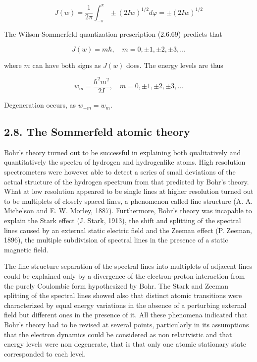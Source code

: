 \documentclass{article}
\begin{document}
\begin{equation*}
J(w)=\frac{1}{2 \pi} \int_{-\pi}^{\pi} \pm(2 I w)^{1 / 2} d \varphi= \pm(2 I w)^{1 / 2} \tag{2.7.19}
\end{equation*}
 

The Wilson-Sommerfeld quantization prescription (2.6.69) predicts that
 
\begin{equation*}
J(w)=m \hbar, \quad m=0, \pm 1, \pm 2, \pm 3, \ldots \tag{2.7.20}
\end{equation*}
 
where $m$ can have both signs as $J(w)$ does. The energy levels are thus
 
\begin{equation*}
w_{m}=\frac{\hbar^{2} m^{2}}{2 I}, \quad m=0, \pm 1, \pm 2, \pm 3, \ldots \tag{2.7.21}
\end{equation*}
 

Degeneration occurs, as $w_{-m}=w_{m}$.

\subsection*{2.8. The Sommerfeld atomic theory}

Bohr's theory turned out to be successful in explaining both qualitatively and quantitatively the spectra of hydrogen and hydrogenlike atoms. High resolution spectrometers were however able to detect a series of small deviations of the actual structure of the hydrogen spectrum from that predicted by Bohr's theory. What at low resolution appeared to be single lines at higher resolution turned out to be multiplets of closely spaced lines, a phenomenon called fine structure (A. A. Michelson and E. W. Morley, 1887). Furthermore, Bohr's theory was incapable to explain the Stark effect (J. Stark, 1913), the shift and splitting of the spectral lines caused by an external static electric field and the Zeeman effect (P. Zeeman, 1896), the multiple subdivision of spectral lines in the presence of a static magnetic field.

The fine structure separation of the spectral lines into multiplets of adjacent lines could be explained only by a divergence of the electron-proton interaction from the purely Coulombic form hypothesized by Bohr. The Stark and Zeeman splitting of the spectral lines showed also that distinct atomic transitions were characterized by equal energy variations in the absence of a perturbing external field but different ones in the presence of it. All these phenomena indicated that Bohr's theory had to be revised at several points, particularly in its assumptions that the electron dynamics could be considered as non relativistic and that energy levels were non degenerate, that is that only one atomic stationary state corresponded to each level.
\end{document}
